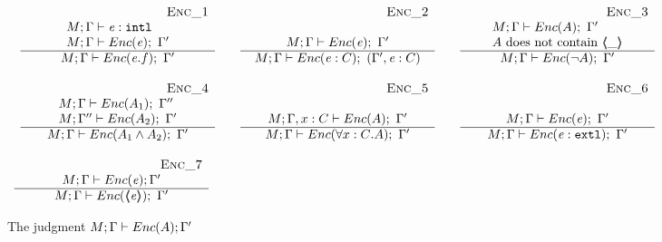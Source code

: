 \begin{figure}[thb]
$
\begin{array}{l}
\begin{array}{lclcl}
\inferruleSDNarrow 
{~ \strut  {\sc{Enc\_1}}}
{  
\begin{array}{l}
M; \Gamma \vdash \re : \prg{intl} \\
M; \Gamma \vdash \encaps{\re};\  \Gamma'
\end{array}
}
{
M; \Gamma \vdash \encaps{\re.f};\  \Gamma'
}
& &
\inferruleSDNarrow 
{~ \strut  {\sc{Enc\_2}}}
{  
\begin{array}{l}
  \\
M; \Gamma \vdash \encaps{\re};\  \Gamma'
\end{array}
}
{
M; \Gamma \vdash \encaps{\re: C};\  (\Gamma', \re:C)
}
& &
\inferruleSDNarrow 
{~ \strut  {\sc{Enc\_3}}}
{   
\begin{array}{l}
M; \Gamma \vdash \encaps{A};\ \Gamma'  \\
 A \mbox{\ does\ not\ contain\ $\inside{\_}$}
\end{array}
}
{
M; \Gamma \vdash \encaps{ \neg A};\  \Gamma'  
}
\\ \\
\inferruleSDNarrow 
{~ \strut  {\sc{Enc\_4}}}
{  
\begin{array}{l}
M; \Gamma \vdash \encaps{A_1};\ \Gamma''   \\
  M; \Gamma'' \vdash \encaps{ A_2};\ \Gamma' 
  \end{array} 
}
{
M; \Gamma \vdash \encaps{A_1 \wedge A_2};\  \Gamma'
}
& &
\inferruleSDNarrow 
{~ \strut  {\sc{Enc\_5}}}
{  
\\
M; \Gamma, {x:C} \vdash \encaps {A};\ \Gamma' 
}
{
M; \Gamma \vdash \encaps {\forall {x:C}. A};\  \Gamma'
}
& & 
\inferruleSDNarrow 
{~ \strut  {\sc{Enc\_6}}}
{  
\\
M; \Gamma \vdash \encaps{\re};\  \Gamma'
}
{
M; \Gamma \vdash \encaps{\re: \prg{extl} };\  \Gamma'
}
\end{array}
\\ \\
\inferruleSDNarrow 
{~ \strut  {\sc{Enc\_7}}}
{  
M; \Gamma \vdash \encaps{\re}; \Gamma' 
}
{
M; \Gamma \vdash \encaps{\inside{\re}}; \ \Gamma' 
}
\end{array}
$
\caption{The judgment $M; \Gamma \vdash {\ensuremath Enc( A )}; \Gamma'$}
\label{f:encaps:aux}
\label{f:encaps}
\end{figure}


